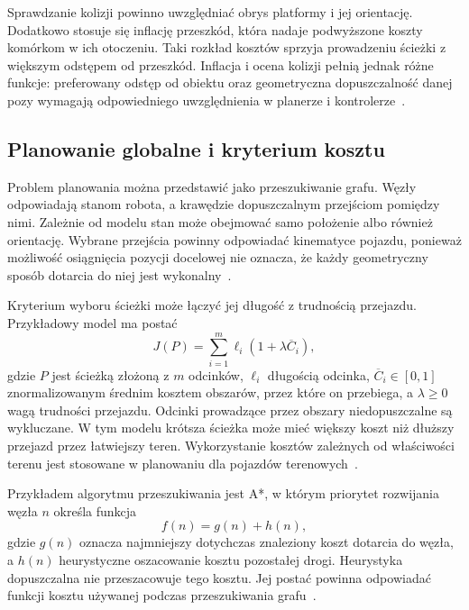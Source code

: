 \documentclass[a4paper,twoside,12pt]{book}
\begin{document}
Sprawdzanie kolizji powinno uwzględniać obrys platformy i jej orientację. Dodatkowo stosuje się inflację przeszkód, która nadaje podwyższone koszty komórkom w ich otoczeniu. Taki rozkład kosztów sprzyja prowadzeniu ścieżki z większym odstępem od przeszkód. Inflacja i ocena kolizji pełnią jednak różne funkcje: preferowany odstęp od obiektu oraz geometryczna dopuszczalność danej pozy wymagają odpowiedniego uwzględnienia w planerze i kontrolerze~\cite{rb3_nav2_costmap,rb3_nav2_inflation}.

\subsection{Planowanie globalne i kryterium kosztu}

Problem planowania można przedstawić jako przeszukiwanie grafu. Węzły odpowiadają stanom robota, a krawędzie dopuszczalnym przejściom pomiędzy nimi. Zależnie od modelu stan może obejmować samo położenie albo również orientację. Wybrane przejścia powinny odpowiadać kinematyce pojazdu, ponieważ możliwość osiągnięcia pozycji docelowej nie oznacza, że każdy geometryczny sposób dotarcia do niej jest wykonalny~\cite{rb35_lavalle2006}.

Kryterium wyboru ścieżki może łączyć jej długość z trudnością przejazdu. Przykładowy model ma postać
\begin{equation}
    J(P) = \sum_{i=1}^{m}
        \ell_i\left(1 + \lambda\overline{C}_i\right),
    \label{eq:planowanie-koszt-sciezki}
\end{equation}
gdzie $P$ jest ścieżką złożoną z $m$ odcinków, $\ell_i$ długością odcinka, $\overline{C}_i \in [0,1]$ znormalizowanym średnim kosztem obszarów, przez które on przebiega, a $\lambda \geq 0$ wagą trudności przejazdu. Odcinki prowadzące przez obszary niedopuszczalne są wykluczane. W tym modelu krótsza ścieżka może mieć większy koszt niż dłuższy przejazd przez łatwiejszy teren. Wykorzystanie kosztów zależnych od właściwości terenu jest stosowane w planowaniu dla pojazdów terenowych~\cite{drones8090419}.

Przykładem algorytmu przeszukiwania jest A*, w którym priorytet rozwijania węzła $n$ określa funkcja
\begin{equation}
    f(n) = g(n) + h(n),
    \label{eq:planowanie-astar}
\end{equation}
gdzie $g(n)$ oznacza najmniejszy dotychczas znaleziony koszt dotarcia do węzła, a $h(n)$ heurystyczne oszacowanie kosztu pozostałej drogi. Heurystyka dopuszczalna nie przeszacowuje tego kosztu. Jej postać powinna odpowiadać funkcji kosztu używanej podczas przeszukiwania grafu~\cite{rb3_hart1968}.
\end{document}
